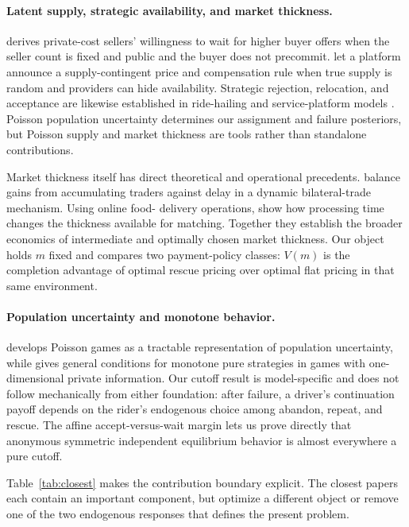 \documentclass[mnsc,blindrev]{informs3}
\begin{document}
\paragraph{Latent supply, strategic availability, and market thickness.}
\citet{Chen2012} derives private-cost sellers' willingness to wait for higher
buyer offers when the seller count is fixed and public and the buyer does not
precommit.  \citet{BaiEtAl2023} let a platform announce a supply-contingent
price and compensation rule when true supply is random and providers can hide
availability.  Strategic rejection, relocation, and acceptance are likewise
established in ride-hailing and service-platform models
\citep{GudaSubramanian2019,GargNazerzadeh2022,AfecheEtAl2023,
FengWang2023,MeskarEtAl2023}.  Poisson population uncertainty determines our
assignment and failure posteriors, but Poisson supply and market thickness are
tools rather than standalone contributions.

Market thickness itself has direct theoretical and operational precedents.
\citet{LoertscherMuirTaylor2022} balance gains from accumulating traders
against delay in a dynamic bilateral-trade mechanism.  Using online food-
delivery operations, \citet{ZhaoPapierTeo2024} show how processing time changes
the thickness available for matching.  Together they establish the broader
economics of intermediate and optimally chosen market thickness.  Our object
holds $m$ fixed and compares two payment-policy classes:
$V(m)$ is the completion advantage of optimal rescue pricing over optimal flat
pricing in that same environment.

\paragraph{Population uncertainty and monotone behavior.}
\citet{Myerson1998} develops Poisson games as a tractable representation of
population uncertainty, while \citet{Athey2001} gives general conditions for
monotone pure strategies in games with one-dimensional private information.
Our cutoff result is model-specific and does not follow mechanically from
either foundation: after failure, a driver's continuation payoff depends on
the rider's endogenous choice among abandon, repeat, and rescue.  The affine
accept-versus-wait margin lets us prove directly that anonymous symmetric
independent equilibrium behavior is almost everywhere a pure cutoff.

Table~\ref{tab:closest} makes the contribution boundary explicit.  The
closest papers each contain an important component, but optimize a different
object or remove one of the two endogenous responses that defines the present
problem.
\end{document}
